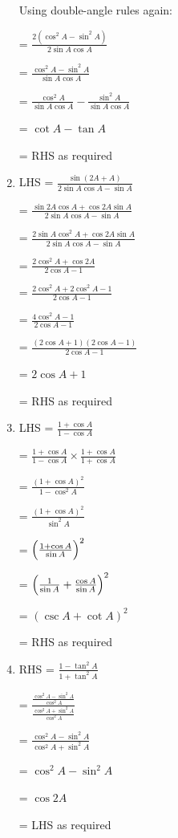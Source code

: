 \documentclass[../main.tex]{subfiles}
\begin{document}
\begin{enumerate}
    Using double-angle rules again:

    = $\frac{2(\cos^2{A}-\sin^2{A})}{2\sin{A}\cos{A}}$

    = $\frac{\cos^2{A}-\sin^2{A}}{\sin{A}\cos{A}}$

    = $\frac{\cos^2{A}}{\sin{A}\cos{A}}-\frac{\sin^2{A}}{\sin{A}\cos{A}}$

    = $\cot{A}-\tan{A}$

    = RHS as required

    \item LHS = $\frac{\sin{(2A+A)}}{2\sin{A}\cos{A}-\sin{A}}$

    = $\frac{\sin{2A}\cos{A}+\cos{2A}\sin{A}}{2\sin{A}\cos{A}-\sin{A}}$

    = $\frac{2\sin{A}\cos^2{A}+\cos{2A}\sin{A}}{2\sin{A}\cos{A}-\sin{A}}$

    = $\frac{2\cos^2{A}+\cos{2A}}{2\cos{A}-1}$

    = $\frac{2\cos^2{A}+2\cos^2{A}-1}{2\cos{A}-1}$

    = $\frac{4\cos^2{A}-1}{2\cos{A}-1}$

    = $\frac{(2\cos{A}+1)(2\cos{A}-1)}{2\cos{A}-1}$

    = $2\cos{A}+1$

    = RHS as required

    \item LHS = $\frac{1+\cos{A}}{1-\cos{A}}$

    = $\frac{1+\cos{A}}{1-\cos{A}}\times \frac{1+\cos{A}}{1+\cos{A}}$

    = $\frac{(1+\cos{A})^2}{1-\cos^2{A}}$

    = $\frac{(1+\cos{A})^2}{\sin^2{A}}$

    = $\Bigl(\frac{1+\cos{A}}{\sin{A}}\Bigr)^2$

    = $\Bigl(\frac{1}{\sin{A}}+\frac{\cos{A}}{\sin{A}}\Bigr)^2$

    = $(\csc{A}+\cot{A})^2$

    = RHS as required

    \item RHS = $\frac{1-\tan^2{A}}{1+\tan^2{A}}$

    = $\frac{\frac{\cos^2{A}-\sin^2{A}}{\cos^2{A}}}{\frac{\cos^2{A}+\sin^2{A}}{\cos^2{A}}}$

    = $\frac{\cos^2{A}-\sin^2{A}}{\cos^2{A}+\sin^2{A}}$

    = $\cos^2{A}-\sin^2{A}$

    = $\cos{2A}$

    = LHS as required


\end{enumerate}
\end{document}
